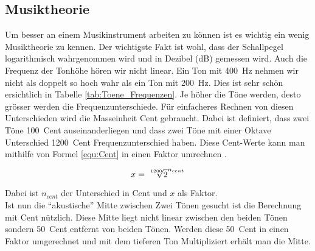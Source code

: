 \subsection{Musiktheorie}\label{subsec:Musiktheorie}

Um besser an einem Musikinstrument arbeiten zu können ist es wichtig ein wenig Musiktheorie zu kennen. Der wichtigste Fakt ist wohl, dass der Schallpegel logarithmisch wahrgenommen wird und in Dezibel (dB) gemessen wird. Auch die Frequenz der Tonhöhe hören wir nicht linear. Ein Ton mit \SI{400}{Hz} nehmen wir nicht als doppelt so hoch wahr als ein Ton mit \SI{200}{Hz}. Dies ist sehr schön ersichtlich in Tabelle \ref{tab:Toene_Frequenzen}. Je höher die Töne werden, desto grösser werden die Frequenzunterschiede. Für einfacheres Rechnen von diesen Unterschieden wird die Masseinheit Cent gebraucht. Dabei ist definiert, dass zwei Töne \SI{100}{Cent} auseinanderliegen und dass zwei Töne mit einer Oktave Unterschied \SI{1200}{Cent} Frequenzunterschied haben. Diese Cent-Werte kann man mithilfe von Formel \ref{equ:Cent} in einen Faktor umrechnen \cite{Cent}.

\begin{equation}
x = \sqrt[\leftroot{-2}\uproot{1}1200]{2}^{n_{cent}}
\label{equ:Cent}
\end{equation} 

Dabei ist \(n_{cent}\) der Unterschied in Cent und \(x\) als Faktor.\\ Ist nun die ``akustische'' Mitte zwischen Zwei Tönen gesucht ist die Berechnung mit Cent nützlich. Diese Mitte liegt nicht linear zwischen den beiden Tönen sondern \SI{50}{Cent} entfernt von beiden Tönen. Werden diese \SI{50}{Cent} in einen Faktor umgerechnet und mit dem tieferen Ton Multipliziert erhält man die Mitte.





